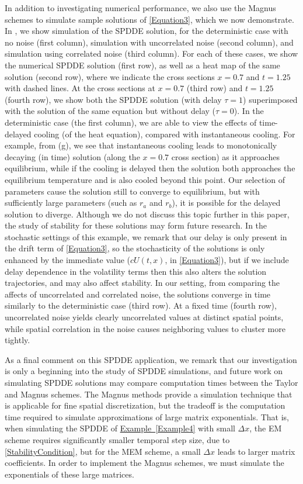 \documentclass[onefignum]{siamart250211}
\begin{document}
\begin{example}
In addition to investigating numerical performance, we also use the Magnus schemes to simulate sample solutions of \cref{Equation3}, which we now demonstrate. In , we show simulation of the SPDDE solution, for the deterministic case with no noise (first column), simulation with uncorrelated noise (second column), and simulation using correlated noise (third column). For each of these cases, we show the numerical SPDDE solution (first row), as well as a heat map of the same solution (second row), where we indicate the cross sections $x=0.7$ and $t=1.25$ with dashed lines. At the cross sections at $x=0.7$ (third row) and $t=1.25$ (fourth row), we show both the SPDDE solution (with delay $\tau=1$) superimposed with the solution of the same equation but without delay ($\tau=0$). In the deterministic case (the first column), we are able to view the effects of time-delayed cooling (of the heat equation), compared with instantaneous cooling. For example, from  (g), we see that instantaneous cooling leads to monotonically decaying (in time) solution (along the $x=0.7$ cross section) as it approaches equilibrium, while if the cooling is delayed then the solution both approaches the equilibrium temperature and is also cooled beyond this point. Our selection of parameters cause the solution still to converge to equilibrium, but with sufficiently large parameters (such as $r_a$ and $r_b$), it is possible for the delayed solution to diverge. Although we do not discuss this topic further in this paper, the study of stability for these solutions may form future research. In the stochastic settings of this example, we remark that our delay is only present in the drift term of \cref{Equation3}, so the stochasticity of the solutions is only enhanced by the immediate value ($cU(t,x)$, in \cref{Equation3}), but if we include delay dependence in the volatility terms then this also alters the solution trajectories, and may also affect stability. In our setting, from comparing the affects of uncorrelated and correlated noise, the solutions converge in time similarly to the deterministic case (third row). At a fixed time (fourth row), uncorrelated noise yields clearly uncorrelated values at distinct spatial points, while spatial correlation in the noise causes neighboring values to cluster more tightly.





As a final comment on this SPDDE application, we remark that our investigation is only a beginning into the study of SPDDE simulations, and future work on simulating SPDDE solutions may compare computation times between the Taylor and Magnus schemes. The Magnus methods provide a simulation technique that is applicable for fine spatial discretization, but the tradeoff is the computation time required to simulate approximations of large matrix exponentials. That is, when simulating the SPDDE of \hyperref[Example4]{Example~\ref*{Example4}} with small $\Delta x$, the EM scheme requires significantly smaller temporal step size, due to \cref{StabilityCondition}, but for the MEM scheme, a small $\Delta x$ leads to larger matrix coefficients. In order to implement the Magnus schemes, we must simulate the exponentials of these large matrices.


\end{example}
\end{document}
